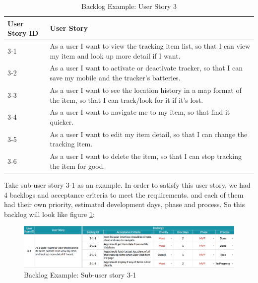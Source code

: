 \documentclass[12pt,a4paper]{article}
\begin{document}
          \begin{table}[H]
            \centering
              \begin{tabularx}{\textwidth}{l X}
                \hline
                 User Story ID & User Story \\ \hline
                 3-1 & As a user I want to view the tracking item list, so that I can view my item and look up more detail if I want. \\
                 3-2 & As a user I want to activate or deactivate tracker, so that I can save my mobile and the tracker's batteries. \\
                 3-3 & As a user I want to see the location history in a map format of the item, so that I can track/look for it if it's lost. \\
                 3-4 & As a user I want to navigate me to my item, so that find it quicker. \\
                 3-5 & As a user I want to edit my item detail, so that I can change the tracking item. \\
                 3-6 & As a user I want to delete the item, so that I can stop tracking the item for good. \\
                \hline
              \end{tabularx}
              \caption[Table caption text]{Backlog Example: User Story 3}
              \label{table:Backlog Example: User Story 3}
          \end{table}   
          
          Take sub-user story 3-1 as an example. In order to satisfy this user story, we had 4 backlogs and acceptance criteria to meet the requirements. and each of them had their own priority, estimated development days, phase and process. So this backlog will look like figure \ref{fig:Backlog Example: Sub-user story 3-1}:
          
          \begin{figure}[H]
            \centering
            \includegraphics[width=1\textwidth]{../assets/development-records-backlog-example.png}
            \caption{Backlog Example: Sub-user story 3-1}
            \label{fig:Backlog Example: Sub-user story 3-1}
          \end{figure}
          
\end{document}
